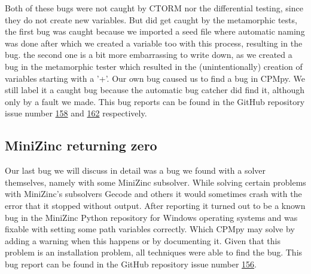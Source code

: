 Both of these bugs were not caught by CTORM nor the differential testing, since they do not create new variables. But did get caught by the metamorphic tests, the first bug was caught because we imported a seed file where automatic naming was done after which we created a variable too with this process, resulting in the bug. the second one is a bit more embarrassing to write down, as we created a bug in the metamorphic tester which resulted in the (unintentionally) creation of variables starting with a '+'. Our own bug caused us to find a bug in CPMpy. We still label it a caught bug because the automatic bug catcher did find it, although only by a fault we made. This bug reports can be found in the GitHub repository issue number \href{https://github.com/CPMpy/cpmpy/issues/158}{158} and \href{https://github.com/CPMpy/cpmpy/issues/162}{162} respectively.


\subsection{MiniZinc returning zero}
\label{res:bug:MinizincZero}
Our last bug we will discuss in detail was a bug we found with a solver themselves, namely with some MiniZinc subsolver. While solving certain problems with MiniZinc's subsolvers Gecode and others it would sometimes crash with the error that it stopped without output. After reporting it turned out to be a known bug in the MiniZinc Python repository for Windows operating systems and was fixable with setting some path variables correctly. Which CPMpy may solve by adding a warning when this happens or by documenting it.
Given that this problem is an installation problem, all techniques were able to find the bug. This bug report can be found in the GitHub repository issue number \href{https://github.com/CPMpy/cpmpy/issues/156}{156}.

%
%



